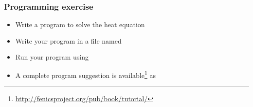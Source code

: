 \begin{frame}
  \frametitle{Programming exercise}

  \begin{itemize}
  \item
    Write a program to solve the heat equation
  \item
    Write your program in a file named 
  \item
    Run your program using \\
    \vspace{0.2cm}
    \quad{}
    \vspace{0.2cm}
  \item
    A complete program suggestion is available\footnote{\url{http://fenicsproject.org/pub/book/tutorial/}} as \\
    \vspace{0.5cm}
    \quad{}
    \vspace{0.2cm}
  \end{itemize}

\end{frame}
